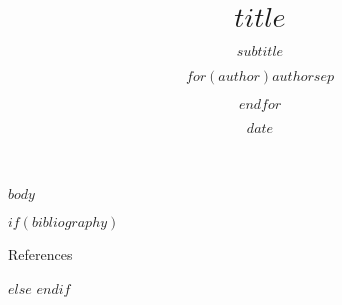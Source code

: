 \documentclass[aspectratio=169,12pt]{beamer}
\title{$title$}
\subtitle{$subtitle$}
\author{$for(author)$$author$$sep$ \and $endfor$}
\date{$date$}
\institute{$for(institute)$$institute$$sep$ \and $endfor$}
\begin{document}
\addtocounter{framenumber}{-1}
\frame{\maketitle}



$body$


$if(bibliography)$
\begin{frame}[allowframebreaks]{References}
  \printbibliography[heading=none]
\end{frame}
$else$
$endif$
\end{document}
